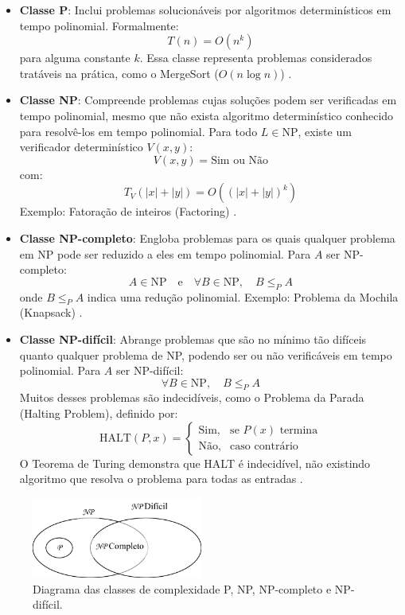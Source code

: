 \documentclass[12pt, a4paper]{article}
\begin{document}
\begin{itemize}
    \item \textbf{Classe P}: Inclui problemas solucionáveis por algoritmos determinísticos em tempo polinomial. Formalmente:
    \[
    T(n) = O(n^k)
    \]
    para alguma constante \( k \). Essa classe representa problemas considerados tratáveis na prática, como o MergeSort (\( O(n \log n) \)) .

    \item \textbf{Classe NP}: Compreende problemas cujas soluções podem ser verificadas em tempo polinomial, mesmo que não exista algoritmo determinístico conhecido para resolvê-los em tempo polinomial. Para todo \( L \in \text{NP} \), existe um verificador determinístico \( V(x,y) \):
    \[
    V(x, y) = \text{Sim ou Não}
    \]
    com:
    \[
    T_V(|x| + |y|) = O((|x| + |y|)^k)
    \]
    Exemplo: Fatoração de inteiros (Factoring) .

    \item \textbf{Classe NP-completo}: Engloba problemas para os quais qualquer problema em NP pode ser reduzido a eles em tempo polinomial. Para \( A \) ser NP-completo:
    \[
    A \in \text{NP} \quad \text{e} \quad \forall B \in \text{NP}, \quad B \leq_P A
    \]
    onde \( B \leq_P A \) indica uma redução polinomial. Exemplo: Problema da Mochila (Knapsack) .

    \item \textbf{Classe NP-difícil}: Abrange problemas que são no mínimo tão difíceis quanto qualquer problema de NP, podendo ser ou não verificáveis em tempo polinomial. Para \( A \) ser NP-difícil:
    \[
    \forall B \in \text{NP}, \quad B \leq_P A
    \]
    Muitos desses problemas são indecidíveis, como o Problema da Parada (Halting Problem), definido por:
    \[
    \text{HALT}(P,x) = 
    \begin{cases}
    \text{Sim}, & \text{se } P(x) \text{ termina} \\
    \text{Não}, & \text{caso contrário}
    \end{cases}
    \]
    O Teorema de Turing demonstra que HALT é indecidível, não existindo algoritmo que resolva o problema para todas as entradas .
\end{itemize}

\begin{figure}[H]
    \centering
    \includegraphics[width=0.5\textwidth]{img/relacaoDeConjuntos.png}
    \caption{Diagrama das classes de complexidade P, NP, NP-completo e NP-difícil.}
    \label{fig:complexidade}
\end{figure}
\end{document}

